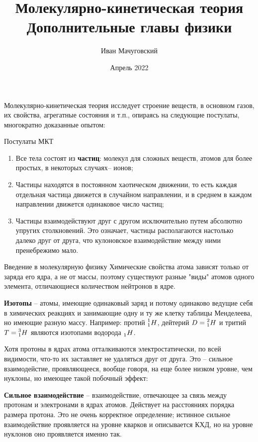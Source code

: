 \documentclass{article}
\title{Молекулярно-кинетическая теория \\ \large Дополнительные главы физики}
\date{Апрель 2022}
\author{Иван Мачуговский}
\newcommand{\definition}[2]{\begin{samepage} \textbf{#1} -- #2. \end{samepage} \par}
\begin{document}
	\maketitle

	Молекулярно-кинетическая теория исследует строение веществ, в основном газов, их свойства, агрегатные состояния и т.п., опираясь на следующие постулаты, многократно доказанные опытом:

	\begin{section}{Постулаты МКТ}
		\begin{enumerate}
			\item Все тела состоят из \textbf{частиц}: молекул для сложных веществ, атомов для более простых, в некоторых случаях--		ионов;

			\item Частицы находятся в постоянном хаотическом движении, то есть каждая отдельная частица движется в случайном направлении, и в среднем в каждом направлении движется одинаковое число частиц;

			\item Частицы взаимодействуют друг с другом исключительно путем абсолютно упругих столкновений. Это означает, частицы располагаются настолько далеко друг от друга, что кулоновское взаимодействие между ними пренебрежимо мало.
		\end{enumerate}
	\end{section}


	\begin{section}{Введение в молекулярную физику}
		Химические свойства атома зависят только от заряда его ядра, а не от массы, поэтому существуют разные "виды" атомов одного элемента, отличающиеся количеством нейтронов в ядре.

		\definition{Изотопы}{атомы, имеющие одинаковый заряд и потому одинаково ведущие себя в химических реакциях и занимающие одну и ту же клетку таблицы Менделеева, но имеющие разную массу. Например: протий $\prescript{1}{1}{H}$, дейтерий $D = \prescript{2}{1}{H}$ и тритий $T = \prescript{3}{1}{H}$ являются изотопами водорода $\prescript{}{1}{H}$}

		Хотя протоны в ядрах атома отталкиваются электростатически, по всей видимости, что-то их заставляет не удаляться друг от друга. Это -- сильное взаимодейстие, проявляющееся, вообще говоря, на еще более низком уровне, чем нуклоны, но имеющее такой побочный эффект:

		\definition{Сильное взаимодействие}{взаимодействие, отвечающее за связь между протонам и электронами в ядрах атомов. Действует на расстояниях порядка размера протона. Это не очень корректное определение; истинное сильное взаимодействие проявляется на уровне кварков и описывается КХД, но на уровне нуклонов оно проявляется именно так}
	\end{section}
\end{document}
